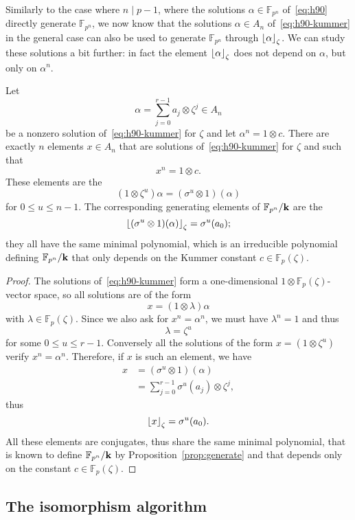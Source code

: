 Similarly to the case where $n\mid p-1$, where the solutions
$\alpha\in\mathbb{F}_{p^n}$ of~\eqref{eq:h90} directly generate $\mathbb{F}_{p^n}$, we now know
that the solutions $\alpha\in A_n$ of~\eqref{eq:h90-kummer} in the general case
can also be used to generate $\mathbb{F}_{p^n}$ through $\left\lfloor \alpha \right\rfloor_{\zeta}$.
We can study these solutions a bit further: in fact the element
$\left\lfloor \alpha \right\rfloor_{\zeta}$ does not depend on $\alpha$, but only on $\alpha^n$.
\begin{prop}
  \label{prop:kummer-constant}
  Let
  \[
    \alpha=\sum_{j=0}^{r-1}a_j\otimes\zeta^j\in A_n
  \]
  be a nonzero solution of~\eqref{eq:h90-kummer} for $\zeta$ and
  let $\alpha^n = 1\otimes c$. There are exactly $n$ elements $x\in A_n$ that
  are solutions of~\eqref{eq:h90-kummer} for $\zeta$ and such that
  \[
    x^n = 1\otimes c.
  \]
  These elements are the
  \[
    (1\otimes\zeta^u)\alpha = (\sigma^u\otimes1)(\alpha)
  \]
  for $0\leq u\leq n-1$. The corresponding generating elements of
  $\mathbb{F}_{p^n}/\mathbf{k}$ are the
  \[
    \left\lfloor (\sigma^u\otimes1)(\alpha) \right\rfloor_{\zeta} = \sigma^u(a_0);
  \]
  they all have the same minimal polynomial, which is an irreducible polynomial
  defining $\mathbb{F}_{p^n}/\mathbf{k}$ that only depends on the Kummer constant
  $c\in\mathbb{F}_{p}(\zeta)$.
\end{prop}
\begin{proof}
  The solutions of~\eqref{eq:h90-kummer} form a one-dimensional
  $1\otimes\mathbb{F}_p(\zeta)$-vector space, so all solutions are of the form
  \[
    x = (1\otimes\lambda)\alpha
  \]
  with $\lambda\in\mathbb{F}_p(\zeta)$.
  Since we also ask for $x^n = \alpha^n$, we must have $\lambda^n = 1$ and thus 
  \[
    \lambda = \zeta^u
  \]
  for some $0\leq u\leq r-1$. Conversely all the solutions of the form
  $x=(1\otimes\zeta^u)$ verify $x^n=\alpha^n$. Therefore, if $x$ is such an
  element, we have
  \begin{align*}
    x &= (\sigma^u\otimes1)(\alpha)\\
    &= \sum_{j=0}^{r-1}\sigma^u(a_j)\otimes\zeta^j,
  \end{align*}
  thus
  \[
    \left\lfloor x \right\rfloor_{\zeta} = \sigma^u(a_0).
  \]
  All these elements are conjugates, thus share the same minimal polynomial,
  that is known to define $\mathbb{F}_{p^n}/\mathbf{k}$ by
  Proposition~\ref{prop:generate} and that depends only on the constant
  $c\in\mathbb{F}_p(\zeta)$.
\end{proof}

\subsection{The isomorphism algorithm}

